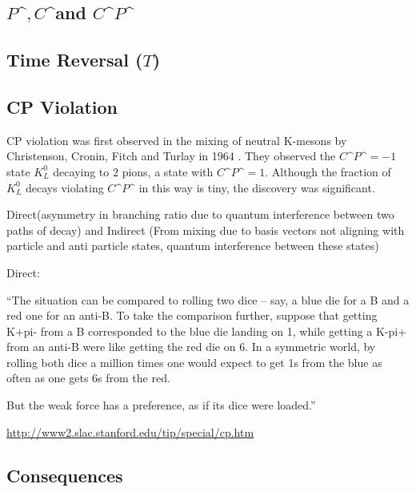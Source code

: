 \subsection{$P\^, C\^ $and $C\^P\^$}

\subsection{Time Reversal ($T$)}

\subsection{CP Violation}

CP violation was first observed in the mixing of neutral K-mesons by Christenson, Cronin, Fitch and Turlay in 1964 \cite{FirstCPV}. They observed the $C\^P\^ = -1$ state $K^{0}_L$ decaying to $2$ pions, a state with $C\^P\^ = 1$. Although the fraction of $K^{0}_L$ decays violating $C\^P\^$ in this way is tiny, the discovery was significant.     

Direct(asymmetry in branching ratio due to quantum interference between two paths of decay) and Indirect (From mixing due to basis vectors not aligning with particle and anti particle states, quantum interference between these states)

Direct:

``The situation can be compared to rolling two dice – say, a blue die for a B and a red one for an anti-B.  To take the comparison further, suppose that getting K+pi- from a B corresponded to the blue die landing on 1, while getting a K-pi+ from an anti-B were like getting the red die on 6. In a symmetric world, by rolling both dice a million times one would expect to get 1s from the blue as often as one gets 6s from the red.

But the weak force has a preference, as if its dice were loaded.''

\url{http://www2.slac.stanford.edu/tip/special/cp.htm}


\subsection{Consequences}
